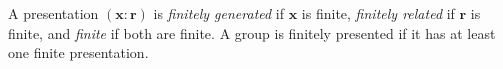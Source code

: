A presentation $(\mathbf{x} : \mathbf{r})$ is \textit{finitely generated} if $\mathbf{x}$ is finite, \textit{finitely related} if $\mathbf{r}$ is finite, and \textit{finite} if both are finite. A group is finitely presented if it has at least one finite presentation.
